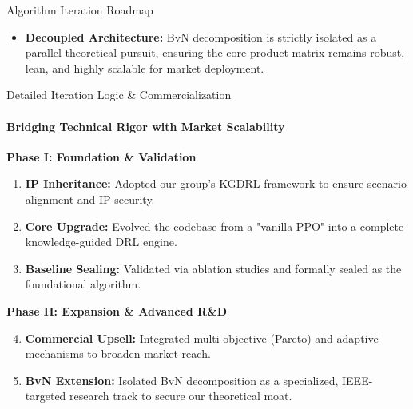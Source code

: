 \documentclass{beamer}
\begin{document}
\begin{frame}{Algorithm Iteration Roadmap}
\begin{center}
{
    }
  \end{center}
  
  \vspace{0.1cm}
  \begin{itemize}
      \item \textbf{Decoupled Architecture:} BvN decomposition is strictly isolated as a parallel theoretical pursuit, ensuring the core product matrix remains robust, lean, and highly scalable for market deployment.
  \end{itemize}
\end{frame}

\begin{frame}{Detailed Iteration Logic \& Commercialization}
  \framesubtitle{Bridging Technical Rigor with Market Scalability}
  
  \textbf{\color{UBCblue}Phase I: Foundation \& Validation}
  \vspace{0.1cm}
  \begin{enumerate}
      \setlength{\itemsep}{0.15cm}
      \item \textbf{IP Inheritance:} Adopted our group's KGDRL framework to ensure scenario alignment and IP security.
      \item \textbf{Core Upgrade:} Evolved the codebase from a "vanilla PPO" into a complete knowledge-guided DRL engine.
      \item \textbf{Baseline Sealing:} Validated via ablation studies and formally sealed as the foundational algorithm.
  \end{enumerate}
  
  \vspace{0.4cm}
  
  \textbf{\color{UBCblue}Phase II: Expansion \& Advanced R\&D}
  \vspace{0.1cm}
  \begin{enumerate}
      \setcounter{enumi}{3}
      \setlength{\itemsep}{0.15cm}
      \item \textbf{Commercial Upsell:} Integrated multi-objective (Pareto) and adaptive mechanisms to broaden market reach.
      \item \textbf{BvN Extension:} Isolated BvN decomposition as a specialized, IEEE-targeted research track to secure our theoretical moat.
  \end{enumerate}
\end{frame}
\end{document}
